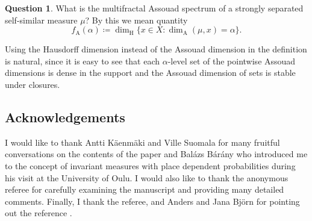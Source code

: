 \documentclass{PRM}
\newcommand{\adim}{\dim_{\mathrm{A}}}
\theoremstyle{plain}
\theoremstyle{definition}
\newtheorem{quest}{Question}
\theoremstyle{remark}
\begin{document}
\begin{quest}
What is the multifractal Assouad spectrum of a strongly separated self-similar measure $\mu$? By this we mean quantity
\begin{equation*}
     f_{\mathrm{A}}(\alpha)\coloneqq \dim_{\mathrm{H}}\{x\in X\colon \adim(\mu,x)=\alpha\}.
\end{equation*}
\end{quest}
Using the Hausdorff dimension instead of the Assouad dimension in the definition is natural, since it is easy to see that each $\alpha$-level set of the pointwise Assouad dimensions is dense in the support and the Assouad dimension of sets is stable under closures.

\subsection*{Acknowledgements}
I would like to thank Antti Käenmäki and Ville Suomala for many fruitful conversations on the contents of the paper and Balázs Bárány who introduced me to the concept of invariant measures with place dependent probabilities during his visit at the University of Oulu. I would also like to thank the anonymous referee for carefully examining the manuscript and providing many detailed comments. Finally, I thank the referee, and Anders and Jana Björn for pointing out the reference \cite{BBL}.


\end{document}

